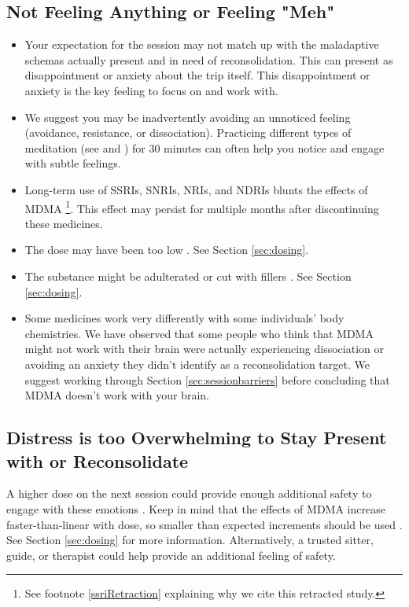 \documentclass[12pt,letterpaper]{book}
\begin{document}
\subsection*{Not Feeling Anything or Feeling "Meh"}
\begin{itemize}
    \item Your expectation for the session may not match up with the maladaptive schemas actually present and in need of reconsolidation. This can present as disappointment or anxiety about the trip itself. This disappointment or anxiety is the key feeling to focus on and work with.
    \item We suggest you may be inadvertently avoiding an unnoticed feeling (avoidance, resistance, or dissociation). Practicing different types of meditation (see \textcite{rain} and \textcite{bodyscan}) for 30 minutes can often help you notice and engage with subtle feelings.
    \item Long-term use of SSRIs, SNRIs, NRIs, and NDRIs blunts the effects of MDMA \cite{feducciaSSRIDiscontinuation}\footnote{See footnote \ref{ssriRetraction} explaining why we cite this retracted study.}. This effect may persist for multiple months after discontinuing these medicines.
    \item The dose may have been too low \cite{bediMDMALowDose}. See Section \ref{sec:dosing}.
    \item The substance might be adulterated or cut with fillers \cite{saleemiAdulterants}. See Section \ref{sec:dosing}.
    \item Some medicines work very differently with some individuals' body chemistries. We have observed that some people who think that MDMA might not work with their brain were actually experiencing dissociation or avoiding an anxiety they didn't identify as a reconsolidation target. We suggest working through Section \ref{sec:sessionbarriers} before concluding that MDMA doesn't work with your brain. 
\end{itemize}
\subsection*{Distress is too Overwhelming to Stay Present with or Reconsolidate}
A higher dose on the next session could provide enough additional safety to engage with these emotions \cite{regan2021Connection}. Keep in mind that the effects of MDMA increase faster-than-linear with dose, so smaller than expected increments should be used \cite{de2000nonlinear}. See Section \ref{sec:dosing} for more information. Alternatively, a trusted sitter, guide, or therapist could help provide an additional feeling of safety.
\end{document}
